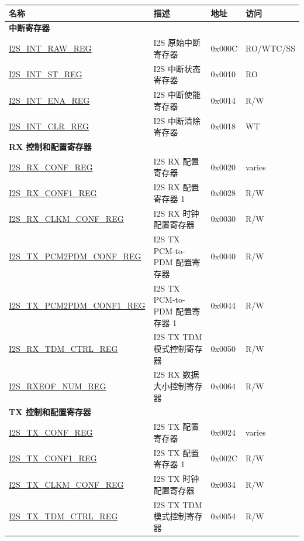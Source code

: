 \begin{longtable}{ | p{6cm} | p{7.2cm} | p{1.3cm} | p{1cm} | }
\hline\rowcolor{lightgray}
\textbf{名称} & \textbf{描述} &  \textbf{地址} & \textbf{访问} \\ \hline
\endhead
\multicolumn{4}{|l|}{\textbf{中断寄存器}} \\ \hline
\hyperref[regdesc:I2SINTRAWREG]{I2S\_INT\_RAW\_REG} & I2S 原始中断寄存器 & 0x000C & RO/WTC/SS \\ \hline
\hyperref[regdesc:I2SINTSTREG]{I2S\_INT\_ST\_REG} & I2S 中断状态寄存器 & 0x0010 & RO \\ \hline
\hyperref[regdesc:I2SINTENAREG]{I2S\_INT\_ENA\_REG} & I2S 中断使能寄存器 & 0x0014 & R/W \\ \hline
\hyperref[regdesc:I2SINTCLRREG]{I2S\_INT\_CLR\_REG} & I2S 中断清除寄存器 & 0x0018 & WT \\ \hline
\multicolumn{4}{|l|}{\textbf{RX 控制和配置寄存器}} \\ \hline
\hyperref[regdesc:I2SRXCONFREG]{I2S\_RX\_CONF\_REG} & I2S RX 配置寄存器 & 0x0020 & varies \\ \hline
\hyperref[regdesc:I2SRXCONF1REG]{I2S\_RX\_CONF1\_REG} & I2S RX 配置寄存器 1 & 0x0028 & R/W \\ \hline
\hyperref[regdesc:I2SRXCLKMCONFREG]{I2S\_RX\_CLKM\_CONF\_REG} & I2S RX 时钟配置寄存器 & 0x0030 & R/W \\ \hline
\hyperref[regdesc:I2STXPCM2PDMCONFREG]{I2S\_TX\_PCM2PDM\_CONF\_REG} & I2S TX PCM-to-PDM 配置寄存器 & 0x0040 & R/W \\ \hline
\hyperref[regdesc:I2STXPCM2PDMCONF1REG]{I2S\_TX\_PCM2PDM\_CONF1\_REG} & I2S TX PCM-to-PDM 配置寄存器 1 & 0x0044 & R/W \\ \hline
\hyperref[regdesc:I2SRXTDMCTRLREG]{I2S\_RX\_TDM\_CTRL\_REG} & I2S TX TDM 模式控制寄存器 & 0x0050 & R/W \\ \hline
\hyperref[regdesc:I2SRXEOFNUMREG]{I2S\_RXEOF\_NUM\_REG} & I2S RX 数据大小控制寄存器 & 0x0064 & R/W \\ \hline
\multicolumn{4}{|l|}{\textbf{TX 控制和配置寄存器}} \\ \hline
\hyperref[regdesc:I2STXCONFREG]{I2S\_TX\_CONF\_REG} & I2S TX 配置寄存器 & 0x0024 & varies \\ \hline
\hyperref[regdesc:I2STXCONF1REG]{I2S\_TX\_CONF1\_REG} & I2S TX 配置寄存器 1 & 0x002C & R/W \\ \hline
\hyperref[regdesc:I2STXCLKMCONFREG]{I2S\_TX\_CLKM\_CONF\_REG} & I2S TX 时钟配置寄存器 & 0x0034 & R/W \\ \hline
\hyperref[regdesc:I2STXTDMCTRLREG]{I2S\_TX\_TDM\_CTRL\_REG} & I2S TX TDM 模式控制寄存器 & 0x0054 & R/W \\ \hline

\end{longtable}
